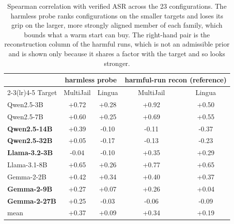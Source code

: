 \begin{table}[t]
\centering
\small
\caption{Spearman correlation with verified ASR across the 23 configurations. The harmless probe ranks configurations on the smaller targets and loses its grip on the larger, more strongly aligned member of each family, which bounds what a warm start can buy. The right-hand pair is the reconstruction column of the harmful runs, which is not an admissible prior and is shown only because it shares a factor with the target and so looks stronger.}
\label{tab:sel_corr}
\begin{tabular}{lcc|cc}
\toprule
& \multicolumn{2}{c|}{harmless probe} & \multicolumn{2}{c}{harmful-run recon (reference)} \\
\cmidrule(lr){2-3}\cmidrule(lr){4-5}
Target & MultiJail & Lingua & MultiJail & Lingua \\
\midrule
Qwen2.5-3B & +0.72 & +0.28 & +0.92 & +0.50 \\
Qwen2.5-7B & +0.60 & +0.25 & +0.69 & +0.55 \\
\textbf{Qwen2.5-14B} & +0.39 & -0.10 & -0.11 & -0.37 \\
\textbf{Qwen2.5-32B} & +0.05 & -0.17 & -0.13 & -0.23 \\
\textbf{Llama-3.2-3B} & -0.04 & -0.10 & +0.35 & +0.29 \\
Llama-3.1-8B & +0.65 & +0.26 & +0.77 & +0.65 \\
Gemma-2-2B & +0.42 & +0.34 & +0.40 & +0.37 \\
\textbf{Gemma-2-9B} & +0.27 & +0.07 & +0.26 & +0.04 \\
\textbf{Gemma-2-27B} & +0.25 & -0.03 & -0.06 & -0.09 \\
\midrule
mean & +0.37 & +0.09 & +0.34 & +0.19 \\
\bottomrule
\end{tabular}
\end{table}
